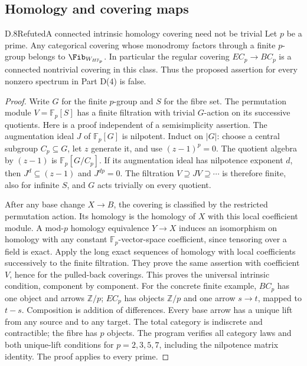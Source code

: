 \subsection{Homology and covering maps}
\begin{claim}{D.8}{Refuted}{A connected intrinsic homology covering need not be trivial}
Let $p$ be a prime. Any categorical covering whose monodromy factors through a finite $p$-group belongs to $\Fib_{W_{H\mathbb F_p}}$. In particular the regular covering $EC_p\to BC_p$ is a connected nontrivial covering in this class. Thus the proposed assertion for every nonzero spectrum in Part D(4) is false.
\end{claim}
\begin{proof}
Write $G$ for the finite $p$-group and $S$ for the fibre set. The permutation module $V=\mathbb F_p[S]$ has a finite filtration with trivial $G$-action on its successive quotients. Here is a proof independent of a semisimplicity assertion. The augmentation ideal $J$ of $\mathbb F_p[G]$ is nilpotent. Induct on $|G|$: choose a central subgroup $C_p\subseteq G$, let $z$ generate it, and use $(z-1)^p=0$. The quotient algebra by $(z-1)$ is $\mathbb F_p[G/C_p]$. If its augmentation ideal has nilpotence exponent $d$, then $J^d\subseteq(z-1)$ and $J^{dp}=0$. The filtration $V\supseteq JV\supseteq\cdots$ is therefore finite, also for infinite $S$, and $G$ acts trivially on every quotient.

After any base change $X\to B$, the covering is classified by the restricted permutation action. Its homology is the homology of $X$ with this local coefficient module. A mod-$p$ homology equivalence $Y\to X$ induces an isomorphism on homology with any constant $\mathbb F_p$-vector-space coefficient, since tensoring over a field is exact. Apply the long exact sequences of homology with local coefficients successively to the finite filtration. They prove the same assertion with coefficient $V$, hence for the pulled-back coverings. This proves the universal intrinsic condition, component by component.
For the concrete finite example, $BC_p$ has one object and arrows $\mathbb Z/p$; $EC_p$ has objects $\mathbb Z/p$ and one arrow $s\to t$, mapped to $t-s$. Composition is addition of differences. Every base arrow has a unique lift from any source and to any target. The total category is indiscrete and contractible; the fibre has $p$ objects. The program verifies all category laws and both unique-lift conditions for $p=2,3,5,7$, including the nilpotence matrix identity. The proof applies to every prime.
\end{proof}

